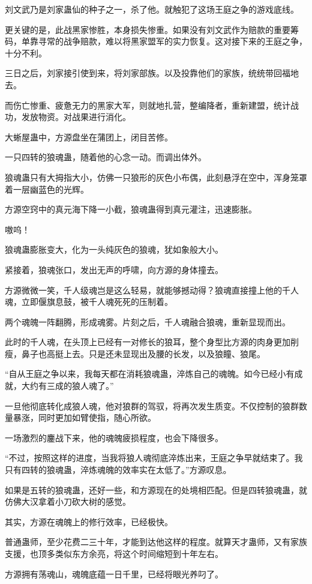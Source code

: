 \begin{this_body}
刘文武乃是刘家蛊仙的种子之一，杀了他。就触犯了这场王庭之争的游戏底线。

更关键的是，此战黑家惨胜，本身损失惨重。如果没有刘文武作为赔款的重要筹码，单靠寻常的战争赔款，难以将黑家盟军的实力恢复。这对接下来的王庭之争，十分不利。

三日之后，刘家接引使到来，将刘家部族。以及投靠他们的家族，统统带回福地去。

而伤亡惨重、疲惫无力的黑家大军，则就地扎营，整编降者，重新建盟，统计战功，发放物资。对战果进行消化。

大蜥屋蛊中，方源盘坐在蒲团上，闭目苦修。

一只四转的狼魂蛊，随着他的心念一动。而调出体外。

狼魂蛊只有大拇指大小，仿佛一只狼形的灰色小布偶，此刻悬浮在空中，浑身笼罩着一层幽蓝色的光辉。

方源空窍中的真元海下降一小截，狼魂蛊得到真元灌注，迅速膨胀。

嗷呜！

狼魂蛊膨胀变大，化为一头纯灰色的狼魂，犹如象般大小。

紧接着，狼魂张口，发出无声的呼啸，向方源的身体撞去。

方源微微一笑，千人级魂岂是这么轻易，就能够撼动得？狼魂直接撞上他的千人魂，立即偃旗息鼓，被千人魂死死的压制着。

两个魂魄一阵翻腾，形成魂雾。片刻之后，千人魂融合狼魂，重新显现而出。

此时的千人魂，在头顶上已经有一对修长的狼耳，整个身型比方源的肉身更加削瘦，鼻子也高挺上去。只是还未显现出及腰的长发，以及狼瞳、狼尾。

“自从王庭之争以来，我每天都在消耗狼魂蛊，淬炼自己的魂魄。如今已经小有成就，大约有三成的狼人魂了。”

一旦他彻底转化成狼人魂，他对狼群的驾驭，将再次发生质变。不仅控制的狼群数量暴涨，同时更加如臂使指，随心所欲。

一场激烈的鏖战下来，他的魂魄疲损程度，也会下降很多。

“不过，按照这样的进度，当我将狼人魂彻底淬炼出来，王庭之争早就结束了。我只有四转的狼魂蛊，淬炼魂魄的效率实在太低了。”方源叹息。

如果是五转的狼魂蛊，还好一些，和方源现在的处境相匹配。但是四转狼魂蛊，就仿佛大汉拿着小刀砍大树的感觉。

其实，方源在魂魄上的修行效率，已经极快。

普通蛊师，至少花费二三十年，才能到达他这样的程度。就算天才蛊师，又有家族支援，也顶多类似东方余亮，将这个时间缩短到十年左右。

方源拥有荡魂山，魂魄底蕴一日千里，已经将眼光养叼了。


\end{this_body}
